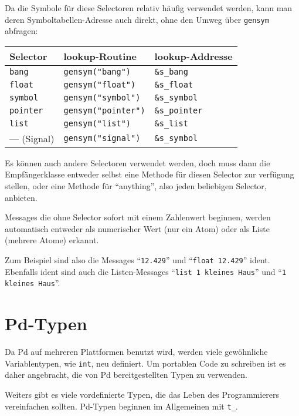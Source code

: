 \documentclass[12pt, a4paper,austrian, titlepage]{article}
\begin{document}
\begin{appendix}
Da die Symbole für diese Selectoren relativ häufig verwendet werden,
kann man deren Symboltabellen-Adresse auch direkt,
ohne den Umweg über \verb+gensym+ abfragen:

\begin{tabular}{l||l|l}
Selector&lookup-Routine&lookup-Addresse\\
\hline
\tt bang &\verb+gensym("bang")+ & \verb+&s_bang+ \\
\tt float &\verb+gensym("float")+ & \verb+&s_float+ \\
\tt symbol &\verb+gensym("symbol")+ & \verb+&s_symbol+ \\
\tt pointer &\verb+gensym("pointer")+ & \verb+&s_pointer+ \\
\tt list &\verb+gensym("list")+ & \verb+&s_list+ \\
--- (Signal) &\verb+gensym("signal")+&\verb+&s_symbol+
\end{tabular}

Es können auch andere Selectoren verwendet werden,
doch muss dann die Empfängerklasse entweder selbst eine Methode
für diesen Selector zur verfügung stellen,
oder eine Methode für ``anything'', also jeden beliebigen Selector, anbieten.

Messages die ohne Selector sofort mit einem Zahlenwert beginnen, werden automatisch
entweder als numerischer Wert (nur ein Atom) oder als Liste (mehrere Atome) erkannt.

Zum Beispiel sind also die Messages ``\verb+12.429+'' und ``\verb+float 12.429+'' ident.
Ebenfalls ident sind auch die Listen-Messages
``\verb+list 1 kleines Haus+'' und ``\verb+1 kleines Haus+''.

\section{Pd-Typen}
Da Pd auf mehreren Plattformen benutzt wird,
werden viele gewöhnliche Variablentypen, wie \verb|int|, neu definiert.
Um portablen Code zu schreiben ist es daher angebracht, die von Pd bereitgestellten
Typen zu verwenden.

Weiters gibt es viele vordefinierte Typen,
die das Leben des Programmierers vereinfachen sollten.
Pd-Typen beginnen im Allgemeinen mit \verb|t_|.


\end{appendix}
\end{document}
